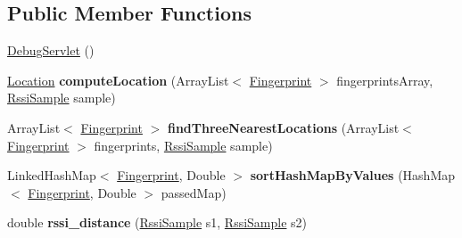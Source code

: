 \subsection*{Public Member Functions}
\begin{DoxyCompactItemize}
\item 
\hyperlink{classcom_1_1servlet_1_1debug_1_1_debug_servlet_a0059d3aa114ee24bcb93829c9bd81f6d}{Debug\+Servlet} ()
\item 
\hyperlink{classcom_1_1servlet_1_1utilities_1_1_location}{Location} {\bfseries compute\+Location} (Array\+List$<$ \hyperlink{classcom_1_1servlet_1_1utilities_1_1_fingerprint}{Fingerprint} $>$ fingerprints\+Array, \hyperlink{classcom_1_1servlet_1_1utilities_1_1_rssi_sample}{Rssi\+Sample} sample)\hypertarget{classcom_1_1servlet_1_1debug_1_1_debug_servlet_ae8805a36c0afc05ab2e74605c87206af}{}\label{classcom_1_1servlet_1_1debug_1_1_debug_servlet_ae8805a36c0afc05ab2e74605c87206af}

\item 
Array\+List$<$ \hyperlink{classcom_1_1servlet_1_1utilities_1_1_fingerprint}{Fingerprint} $>$ {\bfseries find\+Three\+Nearest\+Locations} (Array\+List$<$ \hyperlink{classcom_1_1servlet_1_1utilities_1_1_fingerprint}{Fingerprint} $>$ fingerprints, \hyperlink{classcom_1_1servlet_1_1utilities_1_1_rssi_sample}{Rssi\+Sample} sample)\hypertarget{classcom_1_1servlet_1_1debug_1_1_debug_servlet_a1cdab7caa7adb17d45ddcd680855e645}{}\label{classcom_1_1servlet_1_1debug_1_1_debug_servlet_a1cdab7caa7adb17d45ddcd680855e645}

\item 
Linked\+Hash\+Map$<$ \hyperlink{classcom_1_1servlet_1_1utilities_1_1_fingerprint}{Fingerprint}, Double $>$ {\bfseries sort\+Hash\+Map\+By\+Values} (Hash\+Map$<$ \hyperlink{classcom_1_1servlet_1_1utilities_1_1_fingerprint}{Fingerprint}, Double $>$ passed\+Map)\hypertarget{classcom_1_1servlet_1_1debug_1_1_debug_servlet_ac79a511aafd41c7932723bcba104370f}{}\label{classcom_1_1servlet_1_1debug_1_1_debug_servlet_ac79a511aafd41c7932723bcba104370f}

\item 
double {\bfseries rssi\+\_\+distance} (\hyperlink{classcom_1_1servlet_1_1utilities_1_1_rssi_sample}{Rssi\+Sample} s1, \hyperlink{classcom_1_1servlet_1_1utilities_1_1_rssi_sample}{Rssi\+Sample} s2)\hypertarget{classcom_1_1servlet_1_1debug_1_1_debug_servlet_a1befae824b1f294a6b631ace389b787a}{}\label{classcom_1_1servlet_1_1debug_1_1_debug_servlet_a1befae824b1f294a6b631ace389b787a}

\end{DoxyCompactItemize}
